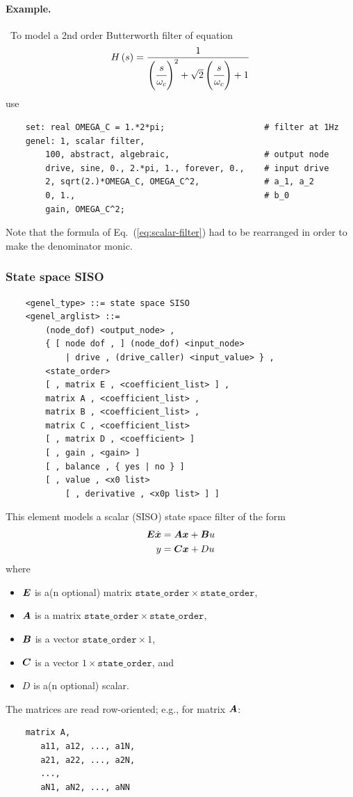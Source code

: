 \paragraph{Example.} \
To model a 2nd order Butterworth filter of equation
\begin{equation}
	H\left( s \right) = \frac{
		1
	}{
		\left( \cfrac{s}{\omega_c} \right)^2
		+ \sqrt{2}\left( \cfrac{s}{\omega_c} \right)
		+ 1
	}
	\label{eq:scalar-filter}
\end{equation}
use
\begin{verbatim}
    set: real OMEGA_C = 1.*2*pi;                    # filter at 1Hz
    genel: 1, scalar filter,
        100, abstract, algebraic,                   # output node
        drive, sine, 0., 2.*pi, 1., forever, 0.,    # input drive
        2, sqrt(2.)*OMEGA_C, OMEGA_C^2,             # a_1, a_2
        0, 1.,                                      # b_0
        gain, OMEGA_C^2;
\end{verbatim}
Note that the formula of Eq.~(\ref{eq:scalar-filter})
had to be rearranged in order to make the denominator monic.




\subsubsection{State space SISO}
\label{sec:EL:GENEL:STATE-SPACE-SISO}
\begin{verbatim}
    <genel_type> ::= state space SISO
    <genel_arglist> ::=
        (node_dof) <output_node> ,
        { [ node dof , ] (node_dof) <input_node>
            | drive , (drive_caller) <input_value> } ,
        <state_order>
        [ , matrix E , <coefficient_list> ] ,
        matrix A , <coefficient_list> ,
        matrix B , <coefficient_list> ,
        matrix C , <coefficient_list>
        [ , matrix D , <coefficient> ]
        [ , gain , <gain> ]
        [ , balance , { yes | no } ]
        [ , value , <x0 list>
            [ , derivative , <x0p list> ] ]
\end{verbatim}
This element models a scalar (SISO) state space filter of the form
\begin{align*}
	\boldsymbol{E} \dot{\boldsymbol{x}} &= \boldsymbol{A} \boldsymbol{x} + \boldsymbol{B} u \\
	y &= \boldsymbol{C} \boldsymbol{x} + D u
\end{align*}
where
\begin{itemize}
\item $\boldsymbol{E}$ is a(n optional) matrix
	$\mathtt{state\_order} \times \mathtt{state\_order}$,
\item $\boldsymbol{A}$ is a matrix
	$\mathtt{state\_order} \times \mathtt{state\_order}$,
\item $\boldsymbol{B}$ is a vector
	$\mathtt{state\_order} \times 1$,
\item $\boldsymbol{C}$ is a vector
	$1 \times \mathtt{state\_order}$, and
\item $D$ is a(n optional) scalar.
\end{itemize}
The matrices are read row-oriented; e.g., for matrix $\boldsymbol{A}$:
\begin{verbatim}
    matrix A,
       a11, a12, ..., a1N,
       a21, a22, ..., a2N,
       ...,
       aN1, aN2, ..., aNN
\end{verbatim}

